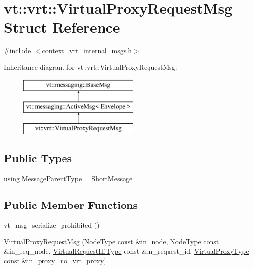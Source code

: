\hypertarget{structvt_1_1vrt_1_1_virtual_proxy_request_msg}{}\section{vt\+:\+:vrt\+:\+:Virtual\+Proxy\+Request\+Msg Struct Reference}
\label{structvt_1_1vrt_1_1_virtual_proxy_request_msg}


{\ttfamily \#include $<$context\+\_\+vrt\+\_\+internal\+\_\+msgs.\+h$>$}

Inheritance diagram for vt\+:\+:vrt\+:\+:Virtual\+Proxy\+Request\+Msg\+:\begin{figure}[H]
\begin{center}
\leavevmode
\includegraphics[height=3.000000cm]{structvt_1_1vrt_1_1_virtual_proxy_request_msg}
\end{center}
\end{figure}
\subsection*{Public Types}
\begin{DoxyCompactItemize}
\item 
using \hyperlink{structvt_1_1vrt_1_1_virtual_proxy_request_msg_a3d01fee6b94b001f36785e32c218b836}{Message\+Parent\+Type} = \hyperlink{namespacevt_a1125ac1da6c0bbf141e0ea0739d7602d}{Short\+Message}
\end{DoxyCompactItemize}
\subsection*{Public Member Functions}
\begin{DoxyCompactItemize}
\item 
\hyperlink{structvt_1_1vrt_1_1_virtual_proxy_request_msg_a61722cc069d676e7efd019c8730788da}{vt\+\_\+msg\+\_\+serialize\+\_\+prohibited} ()
\item 
\hyperlink{structvt_1_1vrt_1_1_virtual_proxy_request_msg_a6110022c17055897cf543078d076fe95}{Virtual\+Proxy\+Request\+Msg} (\hyperlink{namespacevt_a866da9d0efc19c0a1ce79e9e492f47e2}{Node\+Type} const \&in\+\_\+node, \hyperlink{namespacevt_a866da9d0efc19c0a1ce79e9e492f47e2}{Node\+Type} const \&in\+\_\+req\+\_\+node, \hyperlink{namespacevt_1_1vrt_ac7ef8820ebfc383fa16f09bf46eaa2b8}{Virtual\+Request\+I\+D\+Type} const \&in\+\_\+request\+\_\+id, \hyperlink{namespacevt_a1b417dd5d684f045bb58a0ede70045ac}{Virtual\+Proxy\+Type} const \&in\+\_\+proxy=no\+\_\+vrt\+\_\+proxy)
\end{DoxyCompactItemize}
